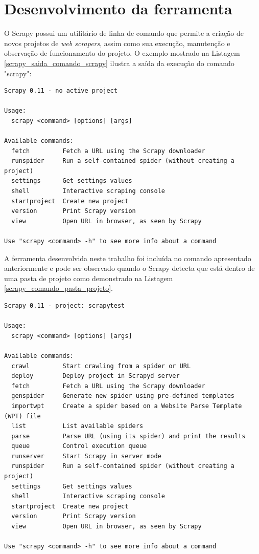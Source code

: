 \section{Desenvolvimento da ferramenta}

O Scrapy possui um utilitário de linha de comando que permite a criação de novos projetos de \emph{web scrapers}, assim como sua execução, manutenção e observação de funcionamento do projeto. O exemplo mostrado na Listagem \ref{scrapy_saida_comando_scrapy} ilustra a saída da execução do comando "scrapy":

\begin{lstlisting}[label=scrapy_saida_comando_scrapy]
Scrapy 0.11 - no active project

Usage:
  scrapy <command> [options] [args]

Available commands:
  fetch         Fetch a URL using the Scrapy downloader
  runspider     Run a self-contained spider (without creating a project)
  settings      Get settings values
  shell         Interactive scraping console
  startproject  Create new project
  version       Print Scrapy version
  view          Open URL in browser, as seen by Scrapy

Use "scrapy <command> -h" to see more info about a command
\end{lstlisting}

A ferramenta desenvolvida neste trabalho foi incluída no comando apresentado anteriormente e pode ser observado quando o Scrapy detecta que está dentro de uma pasta de projeto como demonstrado na Listagem \ref{scrapy_comando_pasta_projeto}.

\pagebreak
{}
\begin{lstlisting}[label=scrapy_comando_pasta_projeto]
Scrapy 0.11 - project: scrapytest

Usage:
  scrapy <command> [options] [args]

Available commands:
  crawl         Start crawling from a spider or URL
  deploy        Deploy project in Scrapyd server
  fetch         Fetch a URL using the Scrapy downloader
  genspider     Generate new spider using pre-defined templates
  importwpt     Create a spider based on a Website Parse Template (WPT) file
  list          List available spiders
  parse         Parse URL (using its spider) and print the results
  queue         Control execution queue
  runserver     Start Scrapy in server mode
  runspider     Run a self-contained spider (without creating a project)
  settings      Get settings values
  shell         Interactive scraping console
  startproject  Create new project
  version       Print Scrapy version
  view          Open URL in browser, as seen by Scrapy

Use "scrapy <command> -h" to see more info about a command

\end{lstlisting}

